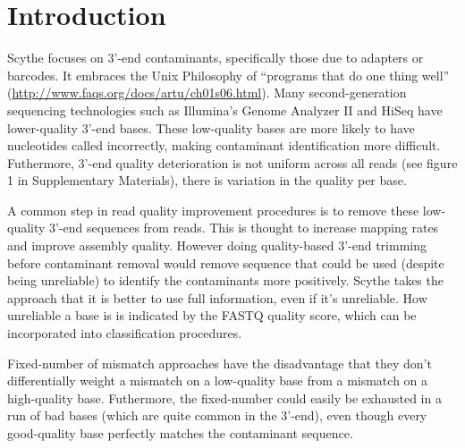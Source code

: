 \documentclass{bioinfo}
\begin{document}
\section{Introduction}
Scythe focuses on 3'-end contaminants, specifically those due to
adapters or barcodes. It embraces the Unix Philosophy of ``programs
that do one thing well''
(\href{http://www.faqs.org/docs/artu/ch01s06.html}{http://www.faqs.org/docs/artu/ch01s06.html}). Many
second-generation sequencing technologies such as Illumina's Genome
Analyzer II and HiSeq have lower-quality 3'-end bases. These
low-quality bases are more likely to have nucleotides called
incorrectly, making contaminant identification more
difficult. Futhermore, 3'-end quality deterioration is not uniform
across all reads (see figure 1 in Supplementary Materials), there is
variation in the quality per base.

A common step in read quality improvement procedures is to remove
these low-quality 3'-end sequences from reads. This is thought to
increase mapping rates and improve assembly quality. However doing
quality-based 3'-end trimming before contaminant removal would remove
sequence that could be used (despite being unreliable) to identify the
contaminants more positively. Scythe takes the approach that it is
better to use full information, even if it's unreliable. How
unreliable a base is is indicated by the FASTQ quality score, which
can be incorporated into classification procedures.

Fixed-number of mismatch approaches have the disadvantage that they
don't differentially weight a mismatch on a low-quality base from a
mismatch on a high-quality base. Futhermore, the fixed-number could
easily be exhausted in a run of bad bases (which are quite common in
the 3'-end), even though every good-quality base perfectly matches the
contaminant sequence.
\end{document}
